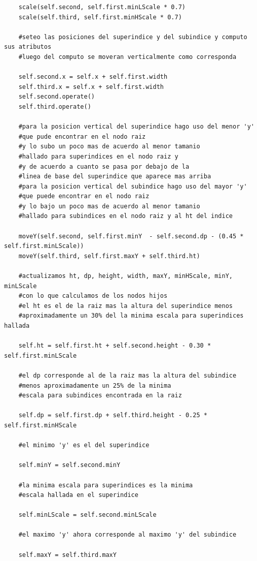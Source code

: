 \begin{verbatim}
    scale(self.second, self.first.minLScale * 0.7)
    scale(self.third, self.first.minHScale * 0.7)

    #seteo las posiciones del superindice y del subindice y computo sus atributos
    #luego del computo se moveran verticalmente como corresponda

    self.second.x = self.x + self.first.width
    self.third.x = self.x + self.first.width
    self.second.operate()
    self.third.operate()
    
    #para la posicion vertical del superindice hago uso del menor 'y' 
    #que pude encontrar en el nodo raiz
    #y lo subo un poco mas de acuerdo al menor tamanio 
    #hallado para superindices en el nodo raiz y
    #y de acuerdo a cuanto se pasa por debajo de la 
    #linea de base del superindice que aparece mas arriba
    #para la posicion vertical del subindice hago uso del mayor 'y' 
    #que puede encontrar en el nodo raiz
    #y lo bajo un poco mas de acuerdo al menor tamanio 
    #hallado para subindices en el nodo raiz y al ht del indice

    moveY(self.second, self.first.minY  - self.second.dp - (0.45 * self.first.minLScale))
    moveY(self.third, self.first.maxY + self.third.ht)

    #actualizamos ht, dp, height, width, maxY, minHScale, minY, minLScale 
    #con lo que calculamos de los nodos hijos
    #el ht es el de la raiz mas la altura del superindice menos
    #aproximadamente un 30% del la minima escala para superindices hallada

    self.ht = self.first.ht + self.second.height - 0.30 * self.first.minLScale

    #el dp corresponde al de la raiz mas la altura del subindice 
    #menos aproximadamente un 25% de la minima 
    #escala para subindices encontrada en la raiz
    
    self.dp = self.first.dp + self.third.height - 0.25 * self.first.minHScale
    
    #el minimo 'y' es el del superindice
    
    self.minY = self.second.minY
    
    #la minima escala para superindices es la minima 
    #escala hallada en el superindice
    
    self.minLScale = self.second.minLScale
    
    #el maximo 'y' ahora corresponde al maximo 'y' del subindice
    
    self.maxY = self.third.maxY
    

\end{verbatim}
